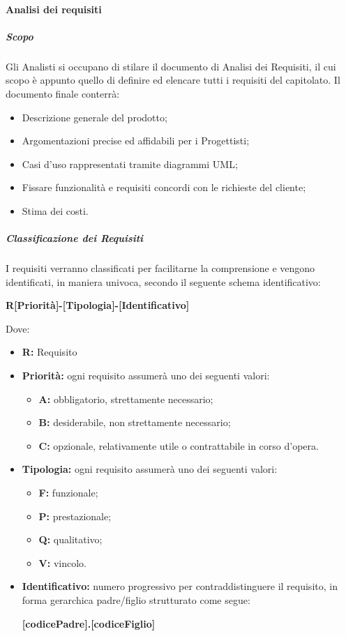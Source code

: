 			\paragraph{Analisi dei requisiti}
				\subparagraph{Scopo}
					Gli Analisti si occupano di stilare il documento di Analisi dei Requisiti, il cui scopo è appunto quello di definire ed elencare tutti i requisiti del capitolato. Il documento finale conterrà:
					\begin{itemize}
						\item Descrizione generale del prodotto;
						\item Argomentazioni precise ed affidabili per i Progettisti;
						\item Casi d'uso rappresentati tramite diagrammi UML;
						\item Fissare funzionalità e requisiti concordi con le richieste del cliente;
						\item Stima dei costi.
					\end{itemize}
				\subparagraph{Classificazione dei Requisiti}
					I requisiti verranno classificati per facilitarne la comprensione e vengono identificati, in maniera univoca, secondo il seguente schema identificativo:
					\begin{center}
						\textbf{R[Priorità]-[Tipologia]-[Identificativo]}
					\end{center}
					Dove:
					\begin{itemize}
						\item \textbf{R:} Requisito 
						\item \textbf{Priorità:} ogni requisito assumerà uno dei seguenti valori:
						\begin{itemize}
							\item \textbf{A:} obbligatorio, strettamente necessario;
							\item \textbf{B:} desiderabile, non strettamente necessario;
							\item \textbf{C:} opzionale, relativamente utile o contrattabile in corso d'opera.
						\end{itemize}
						\item \textbf{Tipologia:} ogni requisito assumerà uno dei seguenti valori:
						\begin{itemize}
							\item \textbf{F:} funzionale;
							\item \textbf{P:} prestazionale;
							\item \textbf{Q:} qualitativo;
							\item \textbf{V:} vincolo.
						\end{itemize}
						\item \textbf{Identificativo:} numero progressivo per contraddistinguere il requisito, in forma gerarchica padre/figlio strutturato come segue: 
						\begin{center}
							\textbf{[codicePadre].[codiceFiglio]}
						\end{center}
					\end{itemize}
